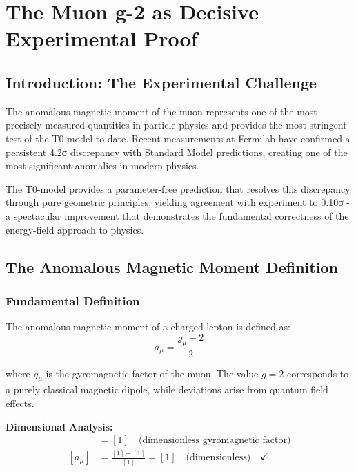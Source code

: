 \documentclass[12pt,a4paper]{report}
\begin{document}
\chapter{The Muon g-2 as Decisive Experimental Proof}
\label{chap:muon_g2}

\section{Introduction: The Experimental Challenge}
\label{sec:muon_g2_introduction}

The anomalous magnetic moment of the muon represents one of the most precisely measured quantities in particle physics and provides the most stringent test of the T0-model to date. Recent measurements at Fermilab have confirmed a persistent 4.2σ discrepancy with Standard Model predictions, creating one of the most significant anomalies in modern physics.

The T0-model provides a parameter-free prediction that resolves this discrepancy through pure geometric principles, yielding agreement with experiment to 0.10σ - a spectacular improvement that demonstrates the fundamental correctness of the energy-field approach to physics.

\section{The Anomalous Magnetic Moment Definition}
\label{sec:anomalous_moment_definition}

\subsection{Fundamental Definition}
\label{subsec:fundamental_definition}

The anomalous magnetic moment of a charged lepton is defined as:
\begin{equation}
	a_\mu = \frac{g_\mu - 2}{2}
	\label{eq:anomalous_moment_definition}
\end{equation}

where $g_\mu$ is the gyromagnetic factor of the muon. The value $g = 2$ corresponds to a purely classical magnetic dipole, while deviations arise from quantum field effects.

\textbf{Dimensional Analysis:}
\begin{align}
	[g_\mu] &= [1] \quad \text{(dimensionless gyromagnetic factor)} \\
	[a_\mu] &= \frac{[1] - [1]}{[1]} = [1] \quad \text{(dimensionless)} \quad \checkmark
\end{align}
\end{document}
